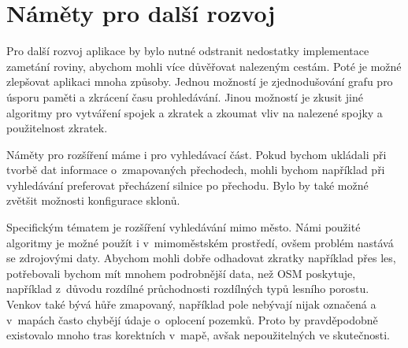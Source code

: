 \section{Náměty pro další rozvoj}
Pro další rozvoj aplikace by bylo nutné odstranit nedostatky implementace
zametání roviny, abychom mohli více důvěřovat nalezeným cestám. Poté je možné
zlepšovat aplikaci mnoha způsoby. Jednou možností je zjednodušování grafu pro
úsporu paměti a zkrácení času prohledávání. Jinou možností je zkusit jiné
algoritmy pro vytváření spojek a zkratek a zkoumat vliv na nalezené spojky a
použitelnost zkratek.

Náměty pro rozšíření máme i pro vyhledávací část. Pokud bychom ukládali při
tvorbě dat informace o~zmapovaných přechodech, mohli bychom například při
vyhledávání preferovat přecházení silnice po přechodu. Bylo by také možné
zvětšit možnosti konfigurace sklonů. 

Specifickým tématem je rozšíření vyhledávání mimo město. Námi použité algoritmy
je možné použít i v~mimoměstském prostředí, ovšem problém nastává se zdrojovými
daty. Abychom mohli dobře odhadovat zkratky například přes les, potřebovali
bychom mít mnohem podrobnější data, než OSM poskytuje, například z~důvodu
rozdílné průchodnosti rozdílných typů lesního porostu. Venkov také bývá hůře
zmapovaný, například pole nebývají nijak označená a v~mapách často chybějí údaje
o~oplocení pozemků. Proto by pravděpodobně existovalo mnoho tras korektních
v~mapě, avšak nepoužitelných ve skutečnosti.
